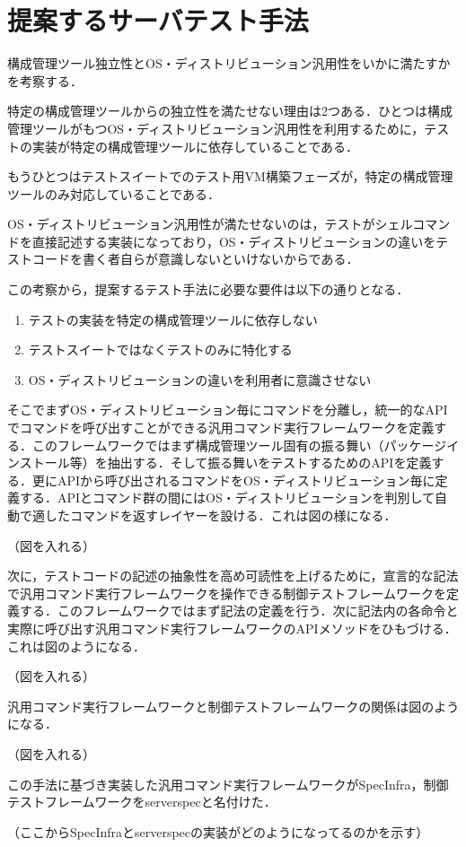 \section{提案するサーバテスト手法}

構成管理ツール独立性とOS・ディストリビューション汎用性をいかに満たすかを考察する．

特定の構成管理ツールからの独立性を満たせない理由は2つある．ひとつは構成管理ツールがもつOS・ディストリビューション汎用性を利用するために，テストの実装が特定の構成管理ツールに依存していることである．

もうひとつはテストスイートでのテスト用VM構築フェーズが，特定の構成管理ツールのみ対応していることである．

OS・ディストリビューション汎用性が満たせないのは，テストがシェルコマンドを直接記述する実装になっており，OS・ディストリビューションの違いをテストコードを書く者自らが意識しないといけないからである．

この考察から，提案するテスト手法に必要な要件は以下の通りとなる．

\begin{enumerate}
  \item テストの実装を特定の構成管理ツールに依存しない
  \item テストスイートではなくテストのみに特化する
  \item OS・ディストリビューションの違いを利用者に意識させない
\end{enumerate}

そこでまずOS・ディストリビューション毎にコマンドを分離し，統一的なAPIでコマンドを呼び出すことができる汎用コマンド実行フレームワークを定義する．このフレームワークではまず構成管理ツール固有の振る舞い（パッケージインストール等）を抽出する．そして振る舞いをテストするためのAPIを定義する．更にAPIから呼び出されるコマンドをOS・ディストリビューション毎に定義する．APIとコマンド群の間にはOS・ディストリビューションを判別して自動で適したコマンドを返すレイヤーを設ける．これは図の様になる．

（図を入れる）

次に，テストコードの記述の抽象性を高め可読性を上げるために，宣言的な記法で汎用コマンド実行フレームワークを操作できる制御テストフレームワークを定義する．このフレームワークではまず記法の定義を行う．次に記法内の各命令と実際に呼び出す汎用コマンド実行フレームワークのAPIメソッドをひもづける．これは図のようになる．

（図を入れる）

汎用コマンド実行フレームワークと制御テストフレームワークの関係は図のようになる．

（図を入れる）

この手法に基づき実装した汎用コマンド実行フレームワークがSpecInfra，制御テストフレームワークをserverspecと名付けた．

（ここからSpecInfraとserverspecの実装がどのようになってるのかを示す）

